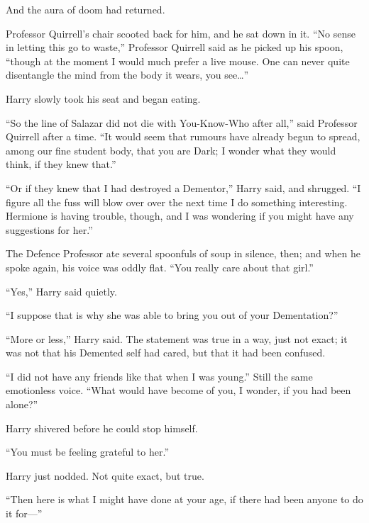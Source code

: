 And the aura of doom had returned.

Professor Quirrell’s chair scooted back for him, and he sat down in it. “No sense in letting this go to waste,” Professor Quirrell said as he picked up his spoon, “though at the moment I would much prefer a live mouse. One can never quite disentangle the mind from the body it wears, you see…”

Harry slowly took his seat and began eating.

\later

“So the line of Salazar did not die with You-Know-Who after all,” said Professor Quirrell after a time. “It would seem that rumours have already begun to spread, among our fine student body, that you are Dark; I wonder what they would think, if they knew that.”

“Or if they knew that I had destroyed a Dementor,” Harry said, and shrugged. “I figure all the fuss will blow over over the next time I do something interesting. Hermione is having trouble, though, and I was wondering if you might have any suggestions for her.”

The Defence Professor ate several spoonfuls of soup in silence, then; and when he spoke again, his voice was oddly flat. “You really care about that girl.”

“Yes,” Harry said quietly.

“I suppose that is why she was able to bring you out of your Dementation?”

“More or less,” Harry said. The statement was true in a way, just not exact; it was not that his Demented self had cared, but that it had been confused.

“I did not have any friends like that when I was young.” Still the same emotionless voice. “What would have become of you, I wonder, if you had been alone?”

Harry shivered before he could stop himself.

“You must be feeling grateful to her.”

Harry just nodded. Not quite exact, but true.

“Then here is what I might have done at your age, if there had been anyone to do it for—”

